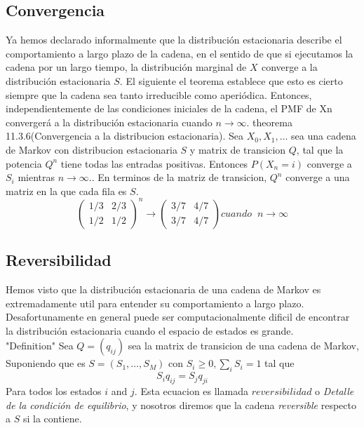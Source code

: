 \documentclass[10pt,a4paper]{article}
\theoremstyle{definition}
\theoremstyle{remark}
\begin{document}
\begin{multicols}{2}
\subsection{Convergencia}
Ya hemos declarado informalmente que la distribución estacionaria describe el
comportamiento a largo plazo de la cadena, en el sentido de que si ejecutamos la cadena por un largo tiempo,
la distribución marginal de $X_{}$ converge a la distribución estacionaria $S$. El siguiente
el teorema establece que esto es cierto siempre que la cadena sea tanto irreducible como aperiódica.
Entonces, independientemente de las condiciones iniciales de la cadena, el PMF de Xn convergerá a la distribución estacionaria cuando  $n \longrightarrow \infty.$ 
theorema 11.3.6(Convergencia a la distribucion estacionaria). Sea $X_0,X_1,\dots $ sea una cadena de Markov con distribucion estacionaria $S$ y matrix de transicion $Q$, tal que la potencia $Q^{n}$ tiene todas las entradas positivas. Entonces $P(X_{n}=i)$ converge a $S_{i}$ mientras  $n \longrightarrow \infty.$. En terminos de la matriz de transicion, $Q^{n}$ converge a una matriz en la que cada fila es $S$.\\


\[
\left( \begin{array}{cccc}
1/3 & 2/3 \\
1/2 & 1/2 \end{array}  \right)^{n}
\rightarrow
\left( \begin{array}{cccc}
3/7 & 4/7 \\
3/7 & 4/7 \end{array}  \right)
cuando \phantom{x} n \rightarrow \infty
\]
\vspace*{1cm}
\subsection{Reversibilidad}
Hemos visto que la distribución estacionaria de una cadena de Markov es extremadamente util para entender su comportamiento a largo plazo. Desafortunamente en general puede ser computacionalmente dificil de encontrar la distribución estacionaria cuando el espacio de estados es grande.\\
"Definition" Sea $Q = (q_{ij})$ sea la matrix de transicion de una cadena de Markov, Suponiendo que es $S=(S_1,\dots,S_M)$ con $S_i\geq0, \sum_{i}S_i = 1$ tal que $$S_{i}q_{ij}=S_{j}q_{ji}$$ Para todos los estados $i$ and $j$. Esta ecuacion es llamada $reversibilidad$ o \textit{Detalle de la condición de equilibrio}, y nosotros diremos que la cadena \textit{reversible} respecto a $S$ si la contiene.


\end{multicols}
\end{document}
